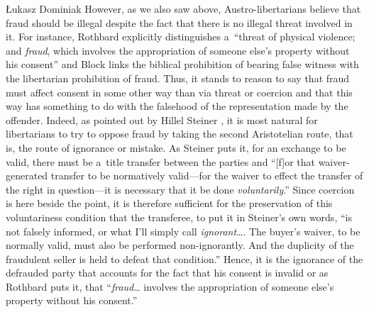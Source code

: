 \begin{artengenv}{Łukasz Dominiak}
However, as we also saw above, Austro-libertarians believe that fraud should be illegal despite the fact that there is no illegal threat involved in it. For instance, Rothbard 
\parencite*[][p.77]{rothbard_ethics_1998} %
 explicitly distinguishes a~``threat of physical violence; and \textit{fraud}, which involves the appropriation of someone else's property without his consent'' and Block 
\parencite*[][p.38]{block_natural_2015} %
 links the biblical prohibition of bearing false witness with the libertarian prohibition of fraud. Thus, it stands to reason to say that fraud must affect consent in some other way than via threat or coercion and that this way has something to do with the falsehood of the representation made by the offender. Indeed, as pointed out by Hillel Steiner 
\parencite*[][p.100]{steiner_asymmetric_2019}, %
 it is most natural for libertarians to try to oppose fraud by taking the second Aristotelian route, that is, the route of ignorance or mistake. As Steiner 
\parencite*[][p.100]{steiner_asymmetric_2019} %
 puts it, for an exchange to be valid, there must be a~title transfer between the parties and ``[f]or that waiver-generated transfer to be normatively valid---for the waiver to effect the transfer of the right in question---it is necessary that it be done \textit{voluntarily}.'' Since coercion is here beside the point, it is therefore sufficient for the preservation of this voluntariness condition that the transferee, to put it in Steiner's 
\parencite*[][p.100]{steiner_asymmetric_2019} %
 own words, ``is not falsely informed, or what I'll simply call \textit{ignorant}…. The buyer's waiver, to be normally valid, must also be performed non-ignorantly. And the duplicity of the fraudulent seller is held to defeat that condition.'' Hence, it is the ignorance of the defrauded party that accounts for the fact that his consent is invalid or as Rothbard 
\parencite*[][p.77]{rothbard_ethics_1998} %
 puts it, that ``\textit{fraud}… involves the appropriation of someone else's property without his consent.''




\end{artengenv}
